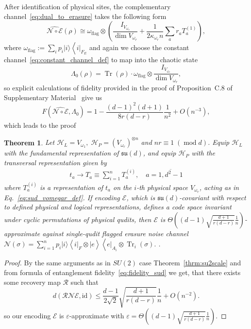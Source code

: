 \documentclass[10pt,twocolumn,superscriptaddress,aps,amsmath,amssymb,citeautoscript,floatfix,prx,longbibliography]{revtex4-2}
\newtheorem{theorem}{Theorem}
\theoremstyle{plain}
\theoremstyle{plain}
\theoremstyle{plain}
\theoremstyle{plain}
\theoremstyle{plain}
\theoremstyle{plain}
\begin{document}
After identification of physical sites, the complementary channel~\eqref{eq:dual_to_erasure} takes the following form
\[
\widehat{\mathcal{N} \circ \mathcal{E}}(\rho)\cong\omega_{\mathrm{flag}} \otimes\left(\frac{I_{V_{\omega_r}}}{\dim V_{\omega_r}}+ \frac{1}{2 \kappa_{\omega_r}n} \sum_a r_a T_a^{(1)}\right),
\]
where $\omega_{\text{flag}}:=\sum_i p_i|i\rangle\left\langle\left. i\right|_{F_E}\right.$ and again we choose the constant channel~\eqref{eq:constant_channel_def} to map into the chaotic state
\[
\Lambda_0(\rho)=\operatorname{Tr}(\rho) \cdot \omega_{\text{flag}} \otimes \frac{I_{V_{\omega_r}}}{\dim V_{\omega_r}},
\]
so explicit calculations of fidelity provided in the proof of Proposition~C.8 of Supplementary Material~\cite{SuppMat} give us
\begin{equation}\label{eq:fidelity_sud}
F\left(\widehat{\mathcal{N} \circ \mathcal{E}}, \Lambda_0\right)=1-\frac{(d-1)^2(d+1)}{8 r(d-r)} \frac{1}{n^2}+O\left(n^{-3}\right),
\end{equation}
which leads to the proof
\begin{theorem}\label{thrm:sudscale}
Let
$
    \mathcal H_L=V_{\omega_1},\;
    \mathcal H_P=(V_{\omega_r})^{\otimes n}
$
and $nr\equiv 1\;(\operatorname{mod} d)$.
Equip \(\mathcal H_L\) with the fundamental representation of
\(\mathfrak{su}(d)\), and equip \(\mathcal H_P\) with the transversal
representation given by
\begin{equation}
\begin{gathered}
t_a \rightarrow T_a \equiv \sum_{i=1}^n T_a^{(i)}, \quad a=\overline{1, d^2-1}
\end{gathered}
\end{equation}
where $T_a^{(i)}$ is a representation of $t_a$ on the $i$-th physical space $V_{\omega_r}$, acting as in  Eq.~\eqref{eq:sud_vomegar_def}.
If encoding $\mathcal{E}$, which is $\mathfrak{su}(d)$-covariant with respect to defined physical and logical representations,  defines a code space invariant under cyclic permutations of physical qudits, then $\mathcal{E}$ is $\Theta\left((d-1)\sqrt{\frac{d+1}{r(d-r)}} \frac{1}{n}\right)$-approximate against single-qudit flagged erasure noise channel $\mathcal{N}(\sigma)=\sum_{i=1}^n p_i|i\rangle\left\langle\left. i\right|_F \otimes \mid e\right\rangle\left\langle\left. e\right|_{A_i} \otimes \operatorname{Tr}_i(\sigma) .\right.$ .
\end{theorem}
\begin{proof}
By the same arguments as in $SU(2)$ case Theorem~\ref{thrm:su2scale} and from formula of entanglement fidelity~\eqref{eq:fidelity_sud} we get, that there exists some recovery map $\mathcal{R}$ such that
\[
    d(\mathcal{R} \mathcal{N} \mathcal{E}, \mathrm{id}) \leq \frac{d-1}{2 \sqrt{2}} \sqrt{\frac{d+1}{r(d-r)}} \frac{1}{n}+O\left(n^{-2}\right).
\]
so our encoding $\mathcal{E}$ is $\varepsilon$-approximate with $\varepsilon=\Theta\left((d-1)\sqrt{\frac{d+1}{r(d-r)}} \frac{1}{n}\right)$.
\end{proof}
\end{document}
